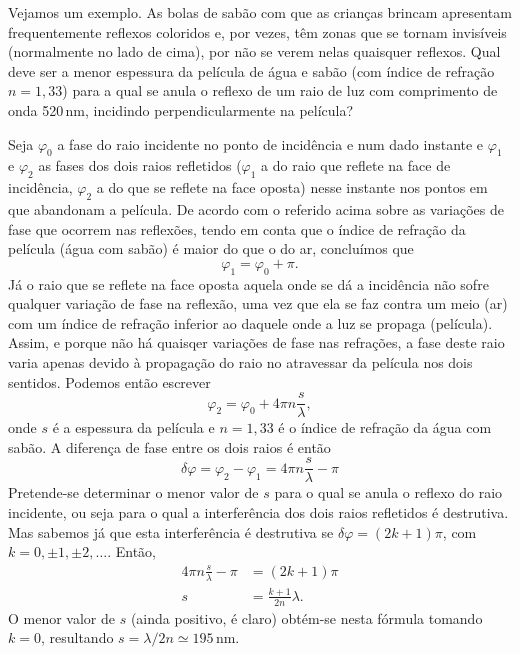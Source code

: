 Vejamos um exemplo. As bolas de sabão com que as crianças brincam apresentam
frequentemente reflexos coloridos e, por vezes, têm zonas que se tornam
invisíveis (normalmente no lado de cima), por não se verem nelas quaisquer
reflexos. Qual deve ser a menor espessura da película de água e sabão (com
índice de refração $n=1,33$) para a qual se anula o reflexo de um raio de luz
com comprimento de onda 520\,nm, incidindo perpendicularmente na película?

Seja $\varphi_0$ a fase do raio incidente no ponto de incidência e num dado
instante e $\varphi_1$ e $\varphi_2$ as fases dos dois raios refletidos
($\varphi_1$ a do raio que reflete na face de incidência, $\varphi_2$ a do que
se reflete na face oposta) nesse instante nos pontos em que abandonam a
película. De acordo com o referido acima sobre as variações de fase que ocorrem
nas reflexões, tendo em conta que o índice de refração da película (água com
sabão) é maior do que o do ar, concluímos que 
\begin{equation*}
\varphi_1=\varphi_0+\pi.
\end{equation*}
Já o raio que se reflete na face oposta aquela onde se dá a incidência não sofre
qualquer variação de fase na reflexão, uma vez que ela se faz contra um meio
(ar) com um índice de refração inferior ao daquele onde a luz se propaga
(película). Assim, e porque não há quaisqer variações de fase nas refrações, a
fase deste raio varia apenas devido à propagação do raio no atravessar da
película nos dois sentidos. Podemos então escrever
\begin{equation*}
\varphi_2= \varphi_0+4\pi n\frac{s}{\lambda},
\end{equation*}
onde $s$ é a espessura da película e $n=1,33$ é o índice de refração da água com
sabão. A diferença de fase entre os dois raios é então
\begin{equation*}
\delta\varphi = \varphi_2-\varphi_1=4\pi n\frac{s}{\lambda}-\pi
\end{equation*}
Pretende-se determinar o menor valor de $s$ para o qual se anula o reflexo do
raio incidente, ou seja para o qual a interferência dos dois raios refletidos é
destrutiva. Mas sabemos já que esta interferência é destrutiva se
$\delta\varphi=(2k+1)\pi$, com $k=0,\pm1,\pm2,\ldots$. Então,
\begin{align*}
4\pi n\frac{s}{\lambda}-\pi&=(2k+1)\pi\\
s&=\frac{k+1}{2n}\lambda.
\end{align*}
O menor valor de $s$ (ainda positivo, é claro) obtém-se nesta fórmula tomando
$k=0$, resultando $s=\lambda/2n\simeq 195$\,nm.

